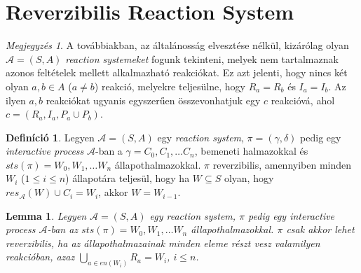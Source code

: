 \documentclass[12pt]{article}
\theoremstyle{definition}
\newtheorem*{definition*}{Definíció}
\theoremstyle{remark}
\newtheorem*{remark*}{Megjegyzés}
\theoremstyle{plain}
\theoremstyle{plain}
\newtheorem*{lemma*}{Lemma}
\begin{document}
    \section*{Reverzibilis Reaction System}

    \begin{remark*}
        A továbbiakban, az általánosság elvesztése nélkül, kizárólag olyan $\mathscr{A} = (S, A)$ \textit{reaction systemeket} fogunk tekinteni, melyek nem tartalmaznak azonos feltételek mellett alkalmazható reakciókat. Ez azt jelenti, hogy nincs két olyan $a, b\in A$ ($a \neq b$) reakció, melyekre teljesülne, hogy $R_{a} = R_{b}$ és $I_{a} = I_{b}$. Az ilyen $a, b$ reakciókat ugyanis egyszerűen összevonhatjuk egy $c$ reakcióvá, ahol $c = (R_{a}, I_{a}, P_{a} \cup P_{b})$.
    \end{remark*}

    \begin{definition*}
        Legyen $\mathscr{A} = (S, A)$ egy \textit{reaction system}, $\pi=(\gamma, \delta)$ pedig egy \textit{interactive process} $\mathscr{A}$-ban a $\gamma = C_{0}, C_{1}, \ldots C_{n}$, bemeneti halmazokkal és $\textit{sts}(\pi)=W_{0},W_{1},\ldots W_{n}$ állapothalmazokkal. $\pi$ reverzibilis, amennyiben minden $W_{i}$ ($1 \leq i \leq n$) állapotára teljesül, hogy ha $W \subseteq S$ olyan, hogy $res_{\mathscr{A}}(W) \cup C_{i} = W_{i}$, akkor $W = W_{i - 1}$.
    \end{definition*}

    \begin{lemma*}
        Legyen $\mathscr{A} = (S, A)$ egy \textit{reaction system}, $\pi$ pedig egy \textit{interactive process} $\mathscr{A}$-ban az $\textit{sts}(\pi)=W_{0},W_{1},\ldots W_{n}$ állapothalmazokkal. $\pi$ csak akkor lehet reverzibilis, ha az állapothalmazainak minden eleme részt vesz valamilyen reakcióban, azaz $\bigcup_{a \in \textit{en}(W_{i})} R_{a} = W_{i}$, $i \leq n$.
    \end{lemma*}
\end{document}
